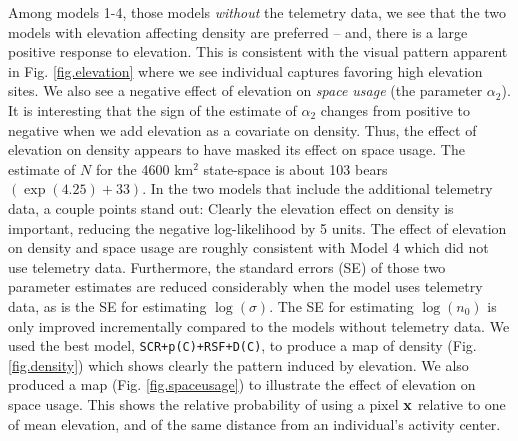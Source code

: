 Among models 1-4, those models {\it without} the telemetry data, we
see that the two models with elevation affecting density are preferred
-- and, there is a large positive response to elevation. This is
consistent with the visual pattern apparent in
Fig. \ref{fig.elevation} where we see individual captures favoring
high elevation sites.  We also see a negative effect of elevation on
{\it space usage} (the parameter $\alpha_{2}$).  It is interesting
that the sign of the estimate of $\alpha_{2}$ changes from positive to
negative when we add elevation as a covariate on density. Thus, the
effect of elevation on density appears to have masked its effect on
space usage.  The estimate of $N$ for the 4600 km$^2$ state-space is
about 103 bears $(\exp(4.25)+33)$.
In the two models that include the additional telemetry data, a couple
points stand out: Clearly the elevation effect on density is
important, reducing the negative log-likelihood by 5 units. The effect
of elevation on density and space usage are roughly consistent with
Model 4 which did not use telemetry data. Furthermore, the standard
errors (SE) of those two parameter estimates are reduced considerably
when the model uses telemetry data, as is the SE for estimating
$\log(\sigma)$.  The SE for estimating $\log(n_{0})$ is only improved
incrementally compared to the models without telemetry data.  We used
the best model, \mbox{\tt SCR+p(C)+RSF+D(C)}, to produce a map of
density (Fig. \ref{fig.density}) which shows clearly the pattern
induced by elevation. We also produced a map
(Fig. \ref{fig.spaceusage}) to illustrate the effect of elevation on
space usage. This shows the relative probability of using a pixel
${\bf x}$ relative to one of mean elevation, and of the same distance
from an individual's activity center.


